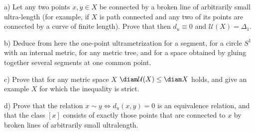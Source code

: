 \documentclass[a4paper,12pt]{report}
\begin{document}
\begin{task}
\textup{a)} Let any two points $x,y\in X$ be connected by a broken line of arbitrarily small ultra-length \textup{(}for example, if $X$ is path connected and any two of its points are connected by a curve of finite length\textup{)}. Prove that then $d_u\equiv 0$ and $\mathcal U(X)=\Delta_1$.

\textup{b)} Deduce from here the one-point ultrametrization for a segment, for a circle $S^1$ with an internal metric, for any metric tree, and for a space obtained by gluing together several segments at one common point.

\textup{c)} Prove that for any metric space $X$ $\diam\mathcal U(X)\le\diam X$ holds, and give an example $X$ for which the inequality is strict.

\textup{d)} Prove that the relation $x\sim y\iff d_u(x,y)=0$ is an equivalence relation, and that the class $[x]$ consists of exactly those points that are connected to $x$ by broken lines of arbitrarily small ultralength.

\end{task}
\end{document}
